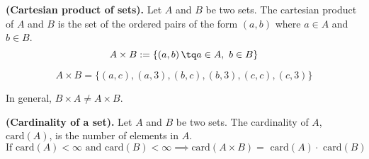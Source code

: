 \begin{definition}
    \textbf{(Cartesian product of sets).} Let $A$ and $B$ be two sets. The cartesian product of $A$ and $B$ is the set of the ordered pairs of the form $\left( a, b \right)$ where $a\in A$ and $b\in B$.
    \begin{equation}
        A\times B := \{\left( a, b \right) \tq a\in A,\ b\in B\} 
    \end{equation}
\end{definition}

\begin{example}[Let $A = \{a, b, c\} $ and $B = \{c, 3\} $.]
    \begin{equation}
        A\times B = \{\left( a, c \right), \left( a, 3 \right), \left( b, c \right), \left( b, 3 \right), \left( c, c \right), \left( c, 3 \right)\}
    \end{equation}
\end{example}
\begin{note}
    In general, $B\times A\neq A\times B$.
\end{note}

\begin{definition}
    \textbf{(Cardinality of a set).} Let $A$ and $B$ be two sets. The cardinality of $A$, $\textrm{card}\left( A \right) $, is the number of elements in $A$.
    \begin{equation}
        \textrm{If card}\left( A \right) < \infty\textrm{ and } \textrm{card}\left( B \right) < \infty \implies \textrm{card}\left( A\times B \right) = \textrm{ card}\left( A \right)\cdot \textrm{ card}\left( B \right)   
    \end{equation}
\end{definition}

